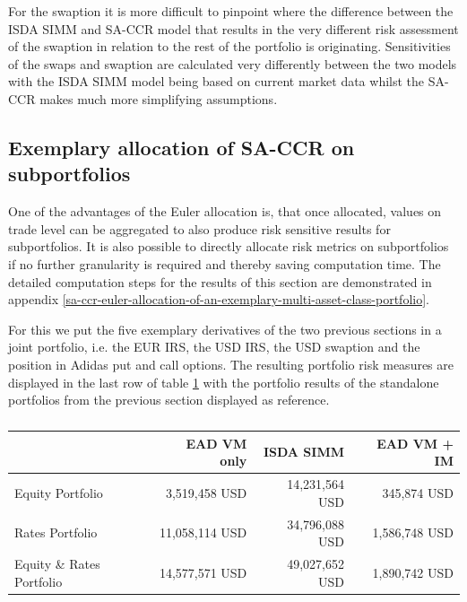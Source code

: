 \documentclass[../Thesis_AHoecherl.tex]{subfiles}
\begin{document}
    For the swaption it is more difficult to pinpoint where the difference between the \gls{ISDA SIMM} and \gls{SA-CCR} model that results in the very different risk assessment of the swaption in relation to the rest of the portfolio is originating.
    Sensitivities of the swaps and swaption are calculated very differently between the two models with the ISDA SIMM model being based on current market data whilst the SA-CCR makes much more simplifying assumptions.

    \subsection{Exemplary allocation of SA-CCR on subportfolios\label{sec:Exemplary allocation of SA-CCR on subportfolios}}

    One of the advantages of the Euler allocation is, that once allocated, values on trade level can be aggregated to also produce risk sensitive results for subportfolios. It is also possible to directly allocate risk metrics on subportfolios if no further granularity is required and thereby saving computation time. The detailed computation steps for the results of this section are demonstrated in appendix \ref{sa-ccr-euler-allocation-of-an-exemplary-multi-asset-class-portfolio}.

    For this we put the five exemplary derivatives of the two previous sections in a joint portfolio, i.e. the EUR IRS, the USD IRS, the USD swaption and the position in Adidas put and call options.
    The resulting portfolio risk measures are displayed in the last row of table \ref{tab:multiAssetResult} with the portfolio results of the standalone portfolios from the previous section displayed as reference.

    \begin{table}[htbp]
        \centering
        \begin{tabular}{l||r|r|r}
                & EAD VM only &ISDA SIMM & EAD VM + IM \\
                \toprule
        Equity Portfolio & 3,519,458 USD & 14,231,564 USD & 345,874 USD \\
        Rates Portfolio & 11,058,114 USD & 34,796,088 USD & 1,586,748 USD \\
        \midrule
        Equity \& Rates Portfolio & 14,577,571 USD & 49,027,652  USD & 1,890,742 USD \\
        \end{tabular}%
        \caption{}
        \label{tab:multiAssetResult}%
    \end{table}%
\end{document}
